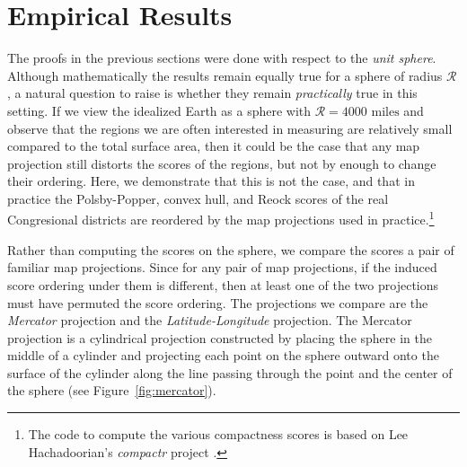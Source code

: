 
\section{Empirical Results}\label{sec:exper}




The proofs in the previous sections were done with respect to the \textit{unit sphere}.  Although mathematically the results remain equally true for a sphere of radius $\mathcal{R}$, a natural question to raise is whether they remain \textit{practically} true in this setting.  If we view the idealized Earth as a sphere with  $\mathcal{R}=4000\text{ miles}$ and observe that the regions we are often interested in measuring are relatively small compared to the total surface area, then it could be the case that any map projection still distorts the scores of the regions, but not by enough to change their ordering.  Here, we demonstrate that this is not the case, and that in practice the Polsby-Popper, convex hull, and Reock scores of the real Congresional districts are reordered by the map projections used in practice.\footnote{The code to compute the various compactness scores is based on Lee Hachadoorian's \textit{compactr} project \cite{hachadoorian2018reock}.}

Rather than computing the scores on the sphere, we compare the scores a pair of familiar map projections.  Since for any pair of map projections, if the induced score ordering under them is different, then at least one of the two projections must have permuted the score ordering.  The projections we compare are the \textit{Mercator} projection and the \textit{Latitude-Longitude} projection.  The Mercator projection is a cylindrical projection constructed by placing the sphere in the middle of a cylinder and projecting each point on the sphere outward onto the surface of the cylinder along the line passing through the point and the center of the sphere (see Figure~\ref{fig:mercator}).

